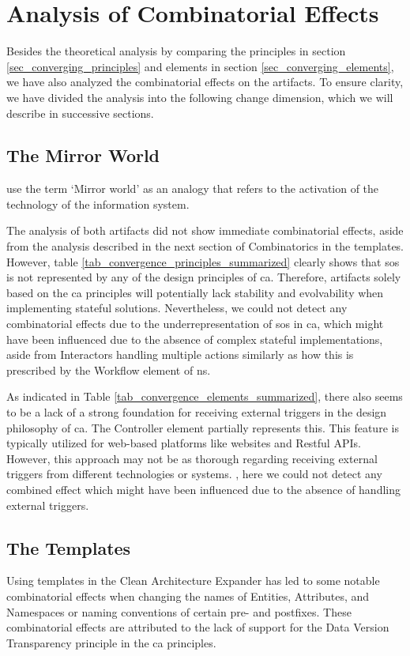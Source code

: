 \section{Analysis of Combinatorial Effects} \label{combinatorics}

Besides the theoretical analysis by comparing the principles in section
\ref{sec_converging_principles} and elements in section \ref{sec_converging_elements}, we
have also analyzed the combinatorial effects on the artifacts. To ensure clarity, we have
divided the analysis into the following change dimension, which we will describe in
successive sections.

\subsection{The Mirror World}
\textcite[137]{mannaert_normalized_2016} use the term \enquote*{Mirror world} as an
analogy that refers to the activation of the technology of the information system. 

The analysis of both artifacts did not show immediate combinatorial effects, aside
from the analysis described in the next section of Combinatorics in the templates.
However, table \ref{tab_convergence_principles_summarized} clearly shows that \gls{sos} is
not represented by any of the design principles of \gls{ca}. Therefore, artifacts solely
based on the \gls{ca} principles will potentially lack stability and evolvability when
implementing stateful solutions. Nevertheless, we could not detect any combinatorial
effects due to the underrepresentation of \acrlong{sos} in \gls{ca}, which might have been
influenced due to the absence of complex stateful implementations, aside from Interactors
handling multiple actions similarly as how this is prescribed by the Workflow element of
\gls{ns}.

As indicated in Table \ref{tab_convergence_elements_summarized}, there also seems to be a
lack of a strong foundation for receiving external triggers in the design philosophy of
\gls{ca}. The Controller element partially represents this. This feature is typically
utilized for web-based platforms like websites and Restful APIs. However, this approach
may not be as thorough regarding receiving external triggers from different technologies
or systems. , here we could not detect any combined effect which might have been
influenced due to the absence of handling external triggers.

\subsection{The Templates}
Using templates in the Clean Architecture Expander has led to some notable combinatorial 
effects when changing the names of Entities, Attributes, and Namespaces or naming
conventions of certain pre- and postfixes. These combinatorial effects are attributed to
the lack of support for the Data Version Transparency principle in the \gls{ca}
principles.

